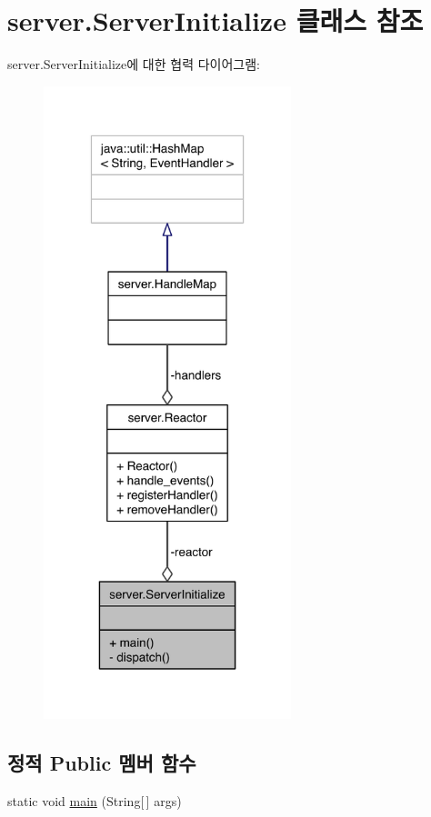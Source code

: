 \hypertarget{classserver_1_1_server_initialize}{\section{server.\-Server\-Initialize 클래스 참조}
\label{classserver_1_1_server_initialize}
}


server.\-Server\-Initialize에 대한 협력 다이어그램\-:
\nopagebreak
\begin{figure}[H]
\begin{center}
\leavevmode
\includegraphics[width=204pt]{classserver_1_1_server_initialize__coll__graph}
\end{center}
\end{figure}
\subsection*{정적 Public 멤버 함수}
\begin{DoxyCompactItemize}
\item 
static void \hyperlink{classserver_1_1_server_initialize_ac00ce4d8c80d0da9e5c4011101f8ed28}{main} (String\mbox{[}$\,$\mbox{]} args)
\end{DoxyCompactItemize}
